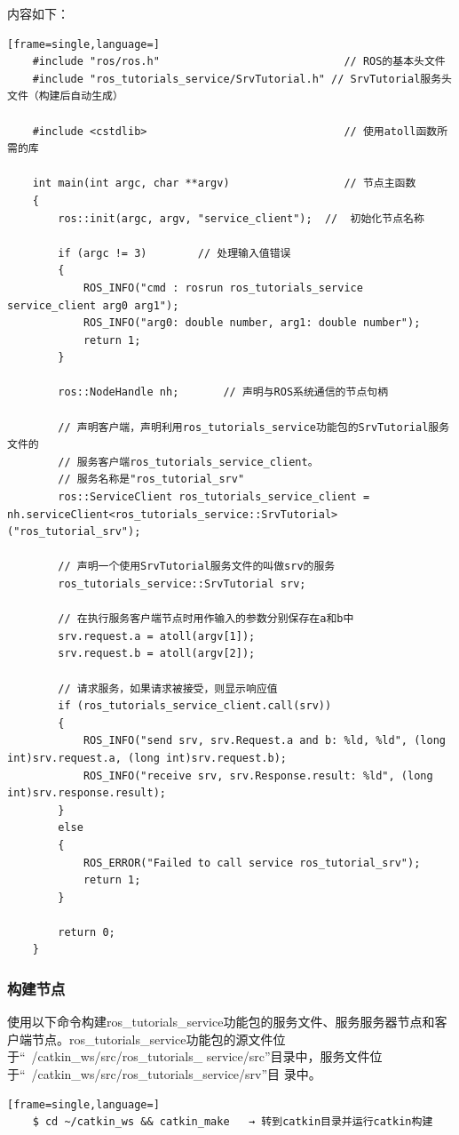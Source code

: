 \documentclass[geye,green,kindle,cn]{elegantnote}
\begin{document}
内容如下：
\begin{lstlisting}[frame=single,language=]
    #include "ros/ros.h"                             // ROS的基本头文件 
    #include "ros_tutorials_service/SrvTutorial.h" // SrvTutorial服务头文件（构建后自动生成） 
    
    #include <cstdlib>                               // 使用atoll函数所需的库 
    
    int main(int argc, char **argv)                  // 节点主函数 
    {  
        ros::init(argc, argv, "service_client");  //  初始化节点名称  
        
        if (argc != 3)        // 处理输入值错误  
        {    
            ROS_INFO("cmd : rosrun ros_tutorials_service service_client arg0 arg1");    
            ROS_INFO("arg0: double number, arg1: double number");    
            return 1;  
        }  
        
        ros::NodeHandle nh;       // 声明与ROS系统通信的节点句柄  
        
        // 声明客户端，声明利用ros_tutorials_service功能包的SrvTutorial服务文件的  
        // 服务客户端ros_tutorials_service_client。  
        // 服务名称是"ros_tutorial_srv"  
        ros::ServiceClient ros_tutorials_service_client = nh.serviceClient<ros_tutorials_service::SrvTutorial>("ros_tutorial_srv");  
        
        // 声明一个使用SrvTutorial服务文件的叫做srv的服务  
        ros_tutorials_service::SrvTutorial srv;  
        
        // 在执行服务客户端节点时用作输入的参数分别保存在a和b中  
        srv.request.a = atoll(argv[1]);  
        srv.request.b = atoll(argv[2]); 
        
        // 请求服务，如果请求被接受，则显示响应值  
        if (ros_tutorials_service_client.call(srv))  
        {    
            ROS_INFO("send srv, srv.Request.a and b: %ld, %ld", (long int)srv.request.a, (long int)srv.request.b);    
            ROS_INFO("receive srv, srv.Response.result: %ld", (long int)srv.response.result);  
        }  
        else  
        {    
            ROS_ERROR("Failed to call service ros_tutorial_srv");    
            return 1;  
        }  
        
        return 0; 
    }
\end{lstlisting}
\subsubsection{构建节点}
使用以下命令构建ros_tutorials_service功能包的服务文件、服务服务器节点和客户端节点。ros_tutorials_service功能包的源文件位于“~/catkin_ws/src/ros_tutorials_ service/src”目录中，服务文件位于“~/catkin_ws/src/ros_tutorials_service/srv”目 录中。 
\begin{lstlisting}[frame=single,language=]
    $ cd ~/catkin_ws && catkin_make   → 转到catkin目录并运行catkin构建
\end{lstlisting}
\end{document}
